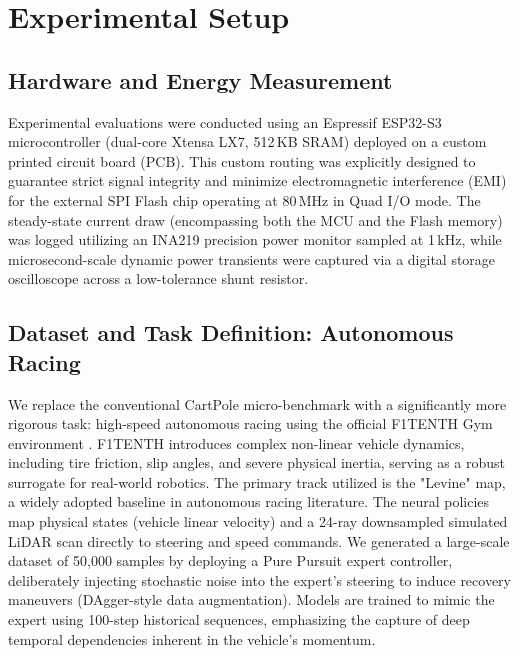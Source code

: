 \documentclass[conference]{IEEEtran}
\begin{document}
\section{Experimental Setup}
\subsection{Hardware and Energy Measurement}
Experimental evaluations were conducted using an Espressif ESP32-S3 microcontroller (dual-core Xtensa LX7, 512\,KB SRAM) deployed on a custom printed circuit board (PCB). This custom routing was explicitly designed to guarantee strict signal integrity and minimize electromagnetic interference (EMI) for the external SPI Flash chip operating at 80\,MHz in Quad I/O mode. The steady-state current draw (encompassing both the MCU and the Flash memory) was logged utilizing an INA219 precision power monitor sampled at 1\,kHz, while microsecond-scale dynamic power transients were captured via a digital storage oscilloscope across a low-tolerance shunt resistor.

\subsection{Dataset and Task Definition: Autonomous Racing}
We replace the conventional CartPole micro-benchmark with a significantly more rigorous task: high-speed autonomous racing using the official F1TENTH Gym environment \cite{okelly2020f1tenth}. F1TENTH introduces complex non-linear vehicle dynamics, including tire friction, slip angles, and severe physical inertia, serving as a robust surrogate for real-world robotics. The primary track utilized is the "Levine" map, a widely adopted baseline in autonomous racing literature. The neural policies map physical states (vehicle linear velocity) and a 24-ray downsampled simulated LiDAR scan directly to steering and speed commands. We generated a large-scale dataset of 50,000 samples by deploying a Pure Pursuit expert controller, deliberately injecting stochastic noise into the expert's steering to induce recovery maneuvers (DAgger-style data augmentation). Models are trained to mimic the expert using 100-step historical sequences, emphasizing the capture of deep temporal dependencies inherent in the vehicle's momentum.
\end{document}
